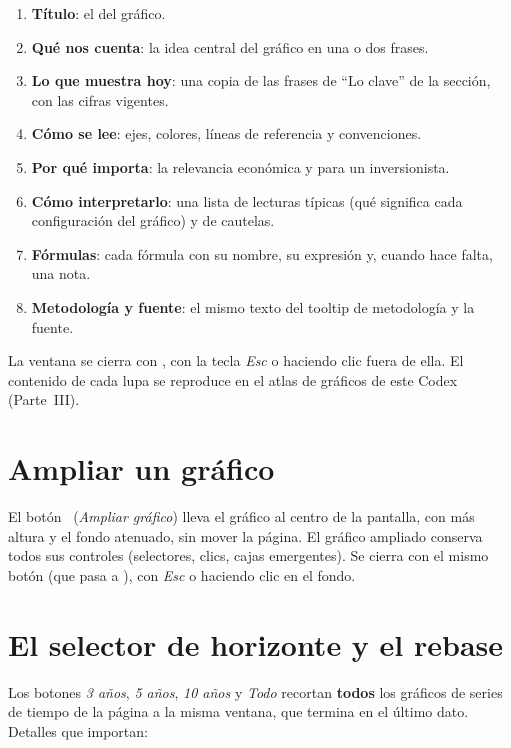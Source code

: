 \begin{enumerate}
\item \textbf{Título}: el del gráfico.
\item \textbf{Qué nos cuenta}: la idea central del gráfico en una o dos frases.
\item \textbf{Lo que muestra hoy}: una copia de las frases de ``Lo clave'' de la sección, con las cifras
  vigentes.
\item \textbf{Cómo se lee}: ejes, colores, líneas de referencia y convenciones.
\item \textbf{Por qué importa}: la relevancia económica y para un inversionista.
\item \textbf{Cómo interpretarlo}: una lista de lecturas típicas (qué significa cada configuración del
  gráfico) y de cautelas.
\item \textbf{Fórmulas}: cada fórmula con su nombre, su expresión y, cuando hace falta, una nota.
\item \textbf{Metodología y fuente}: el mismo texto del tooltip de metodología y la fuente.
\end{enumerate}

La ventana se cierra con , con la tecla \emph{Esc} o haciendo clic fuera de ella. El contenido de cada
lupa se reproduce en el atlas de gráficos de este Codex (Parte~III).

\section{Ampliar un gráfico}
El botón \cmexp\ (\emph{Ampliar gráfico}) lleva el gráfico al centro de la pantalla, con más altura y el fondo
atenuado, sin mover la página. El gráfico ampliado conserva todos sus controles (selectores, clics, cajas
emergentes). Se cierra con el mismo botón (que pasa a ), con \emph{Esc} o haciendo clic en el fondo.

\section{El selector de horizonte y el rebase}
\label{es:u:horizonte}
Los botones \emph{3 años}, \emph{5 años}, \emph{10 años} y \emph{Todo} recortan \textbf{todos} los gráficos de
series de tiempo de la página a la misma ventana, que termina en el último dato. Detalles que importan:

